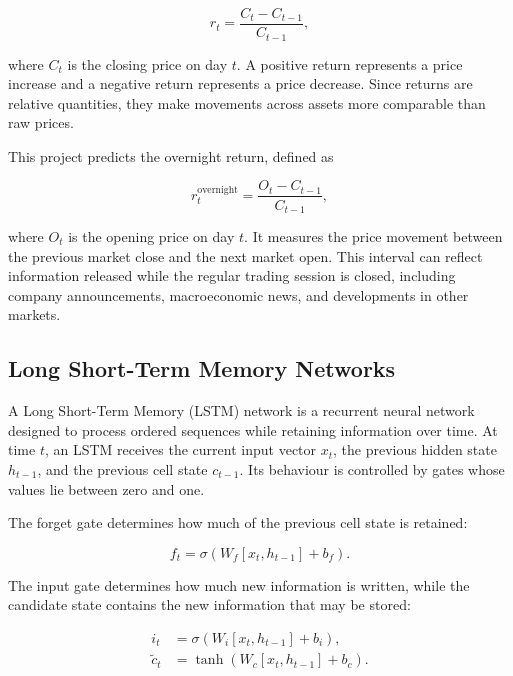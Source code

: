 \documentclass[12pt,a4paper]{article}
\begin{document}
\begin{equation}
    r_t = \frac{C_t-C_{t-1}}{C_{t-1}},
\end{equation}

where $C_t$ is the closing price on day $t$. A positive return represents a
price increase and a negative return represents a price decrease. Since
returns are relative quantities, they make movements across assets more
comparable than raw prices.

This project predicts the overnight return, defined as

\begin{equation}
    r_t^{\mathrm{overnight}}
    = \frac{O_t-C_{t-1}}{C_{t-1}},
\end{equation}

where $O_t$ is the opening price on day $t$. It measures the price movement
between the previous market close and the next market open. This interval can
reflect information released while the regular trading session is closed,
including company announcements, macroeconomic news, and developments in
other markets.

\subsection{Long Short-Term Memory Networks}

A Long Short-Term Memory (LSTM) network is a recurrent neural network designed
to process ordered sequences while retaining information over time. At time
$t$, an LSTM receives the current input vector $x_t$, the previous hidden state
$h_{t-1}$, and the previous cell state $c_{t-1}$. Its behaviour is controlled
by gates whose values lie between zero and one.

The forget gate determines how much of the previous cell state is retained:

\begin{equation}
    f_t = \sigma\left(W_f[x_t,h_{t-1}] + b_f\right).
\end{equation}

The input gate determines how much new information is written, while the
candidate state contains the new information that may be stored:

\begin{align}
    i_t &= \sigma\left(W_i[x_t,h_{t-1}] + b_i\right), \\
    \widetilde{c}_t &= \tanh\left(W_c[x_t,h_{t-1}] + b_c\right).
\end{align}
\end{document}
